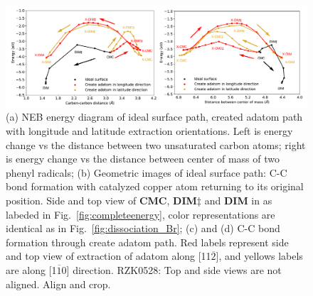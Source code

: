 \documentclass[%
 reprint,
 amsmath,amssymb,
 aps,
prb,
floatfix,
]{revtex4-2}
\newcommand{\comm}{\color{Purple}} %
\begin{document}
\begin{figure}[hbt]
\centering
\includegraphics[width=1.0\textwidth]{Fig/distance-energy.pdf}
\caption{(a) NEB energy diagram of ideal surface path, created adatom path with longitude and latitude extraction orientations. Left is energy change vs the distance between two unsaturated carbon atoms; right is energy change vs the distance between center of mass of two phenyl radicals; (b) Geometric images of ideal surface path: C-C bond formation with catalyzed copper atom returning to its original position. Side and top view of \textbf{CMC}, \textbf{DIM$\ddagger$} and \textbf{DIM} in as labeded in Fig.~\ref{fig:completeenergy}, color representations are identical as in Fig.~\ref{fig:dissociation_Br}; (c) and (d) C-C bond formation through create adatom path. Red labels represent side and top view of extraction of adatom along [11$\overline{2}$], and yellows labels are along [1$\overline{1}$0] direction. {\comm RZK0528: Top and side views are not aligned. Align and crop.}}
\label{fig:distance-energy}
\end{figure}
\end{document}
